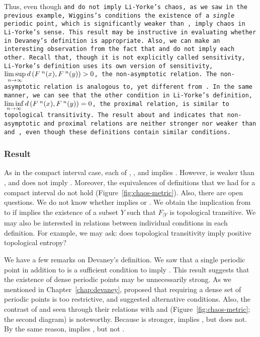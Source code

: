 \documentclass[10pt,twoside,draft]{book}
\begin{document}
Thus, even though \tt and \sdic do not imply Li-Yorke's chaos, as we saw in the previous example, Wiggins's conditions the existence of a \textit{single} periodic point, which is significantly weaker than \dpp, imply chaos in Li-Yorke's sense.
This result may be instructive in evaluating whether \dpp in Devaney's definition is appropriate.
Also, we can make an interesting observation from the fact that \wig and \liy do not imply each other. 
Recall that, though it is not explicitly called sensitivity, Li-Yorke's definition uses its own version of sensitivity, $\limsup\limits_{n\to \infty} d\left( F^{\;n}(x), F^{\;n}(y) \right) > 0$, the non-asymptotic relation.
The non-asymptotic relation is analogous to, yet different from \sdic.
In the same manner, we can see that the other condition in Li-Yorke's definition, $\liminf\limits_{n\to \infty} d\left( F^{\;n}(x), F^{\;n}(y) \right) = 0$, the proximal relation, is similar to topological transitivity.
The result about \wig and \liy indicates that non-asymptotic and proximal relations are neither stronger nor weaker than \tt and \sdic, even though these definitions contain similar conditions.

\subsubsection*{Result}
As in the compact interval case, each of \dev, \blcp, and \akm implies \liy.
However, \wig is weaker than \dev, and does not imply \liy.
Moreover, the equivalences of definitions that we had for a compact interval do not hold (Figure~\ref{fig:chaos-metric}).
Also, there are open questions.
We do not know whether \akm implies \blcp or \dev.
We obtain the implication from \akm to \wig if \akm implies the existence of a subset $Y$ such that $F_{|Y}$ is topological transitive.
We may also be interested in relations between individual conditions in each definition.
For example, we may ask: does topological transitivity imply positive topological entropy?

We have a few remarks on Devaney's definition.
We saw that a single periodic point in addition to \wig is a sufficient condition to imply \liy. 
This result suggests that the existence of dense periodic points may be unnecessarily strong.
As we mentioned in Chapter~\ref{chap:devaney}, \citet{glasner} proposed that requiring a dense set of periodic points is too restrictive, and suggested alternative conditions.
Also, the contrast of \dev and \wig seen through their relations with \akm and \liy (Figure~\ref{fig:chaos-metric}; the second diagram) is noteworthy.
Because \dev is stronger, \dev implies \liy, but \wig does not.
By the same reason, \blcp implies \wig, but not \dev.
\end{document}
